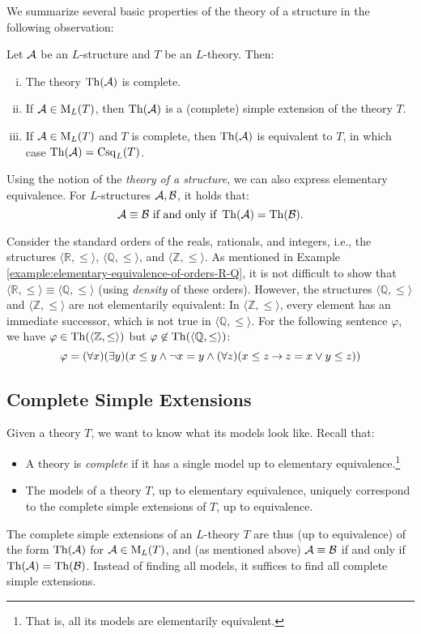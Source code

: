We summarize several basic properties of the theory of a structure in the following observation:

\begin{observation}
    Let $\mathcal{A}$ be an $L$-structure and $T$ be an $L$-theory. Then:
    \begin{enumerate}[(i)]
        \item The theory $\operatorname{Th}(\mathcal{A})$ is complete.
        \item If $\mathcal{A}\in\operatorname{M}_L(T)$, then $\operatorname{Th}(\mathcal{A})$ is a (complete) simple extension of the theory $T$.
        \item If $\mathcal{A}\in\operatorname{M}_L(T)$ and $T$ is complete, then $\operatorname{Th}(\mathcal{A})$ is equivalent to $T$, in which case $\operatorname{Th}(\mathcal{A})=\operatorname{Csq}_L(T)$.
    \end{enumerate}    
\end{observation}

Using the notion of the \emph{theory of a structure}, we can also express elementary equivalence. For $L$-structures $\mathcal{A},\mathcal{B}$, it holds that:
$$
\mathcal{A}\equiv\mathcal{B} \text{ if and only if }\operatorname{Th}(\mathcal{A})=\operatorname{Th}(\mathcal{B}).
$$

\begin{example}
   Consider the standard orders of the reals, rationals, and integers, i.e., the structures $\langle\mathbb{R},\leq\rangle$, $\langle\mathbb{Q},\leq\rangle$, and $\langle\mathbb{Z},\leq\rangle$. As mentioned in Example \ref{example:elementary-equivalence-of-orders-R-Q}, it is not difficult to show that $\langle\mathbb{R},\leq\rangle\equiv\langle\mathbb{Q},\leq\rangle$ (using \emph{density} of these orders). However, the structures $\langle\mathbb{Q},\leq\rangle$ and $\langle\mathbb{Z},\leq\rangle$ are not elementarily equivalent: In $\langle\mathbb{Z},\leq\rangle$, every element has an immediate successor, which is not true in $\langle\mathbb{Q},\leq\rangle$. For the following sentence $\varphi$, we have $\varphi\in\operatorname{Th}(\langle\mathbb{Z},\leq\rangle)$ but $\varphi\not\in\operatorname{Th}(\langle\mathbb{Q},\leq\rangle)$:
   $$
   \varphi=(\forall x)(\exists y)(x\leq y \land \neg x=y \land (\forall z)(x\leq z \mathbin{\rightarrow} z=x\lor y\leq z))
   $$
\end{example}

\subsection{Complete Simple Extensions}

Given a theory $T$, we want to know what its models look like. Recall that:
\begin{itemize}
    \item A theory is \emph{complete} if it has a single model up to elementary equivalence.\footnote{That is, all its models are elementarily equivalent.}
    \item The models of a theory $T$, up to elementary equivalence, uniquely correspond to the complete simple extensions of $T$, up to equivalence.
\end{itemize}
The complete simple extensions of an $L$-theory $T$ are thus (up to equivalence) of the form $\operatorname{Th}(\mathcal{A})$ for $\mathcal{A}\in\operatorname{M}_L(T)$, and (as mentioned above) $\mathcal{A}\equiv\mathcal{B}$ if and only if $\operatorname{Th}(\mathcal{A})=\operatorname{Th}(\mathcal{B})$. Instead of finding all models, it suffices to find all complete simple extensions.

